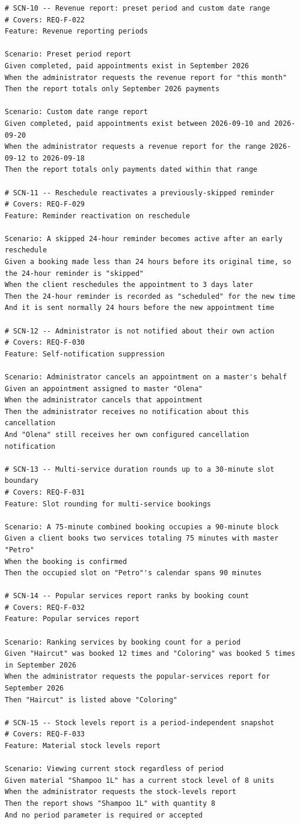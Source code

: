 \documentclass[11pt,a4paper]{article}
\begin{document}
\begin{lstlisting}
# SCN-10 -- Revenue report: preset period and custom date range
# Covers: REQ-F-022
Feature: Revenue reporting periods

Scenario: Preset period report
Given completed, paid appointments exist in September 2026
When the administrator requests the revenue report for "this month"
Then the report totals only September 2026 payments

Scenario: Custom date range report
Given completed, paid appointments exist between 2026-09-10 and 2026-09-20
When the administrator requests a revenue report for the range 2026-09-12 to 2026-09-18
Then the report totals only payments dated within that range

# SCN-11 -- Reschedule reactivates a previously-skipped reminder
# Covers: REQ-F-029
Feature: Reminder reactivation on reschedule

Scenario: A skipped 24-hour reminder becomes active after an early reschedule
Given a booking made less than 24 hours before its original time, so the 24-hour reminder is "skipped"
When the client reschedules the appointment to 3 days later
Then the 24-hour reminder is recorded as "scheduled" for the new time
And it is sent normally 24 hours before the new appointment time

# SCN-12 -- Administrator is not notified about their own action
# Covers: REQ-F-030
Feature: Self-notification suppression

Scenario: Administrator cancels an appointment on a master's behalf
Given an appointment assigned to master "Olena"
When the administrator cancels that appointment
Then the administrator receives no notification about this cancellation
And "Olena" still receives her own configured cancellation notification

# SCN-13 -- Multi-service duration rounds up to a 30-minute slot boundary
# Covers: REQ-F-031
Feature: Slot rounding for multi-service bookings

Scenario: A 75-minute combined booking occupies a 90-minute block
Given a client books two services totaling 75 minutes with master "Petro"
When the booking is confirmed
Then the occupied slot on "Petro"'s calendar spans 90 minutes

# SCN-14 -- Popular services report ranks by booking count
# Covers: REQ-F-032
Feature: Popular services report

Scenario: Ranking services by booking count for a period
Given "Haircut" was booked 12 times and "Coloring" was booked 5 times in September 2026
When the administrator requests the popular-services report for September 2026
Then "Haircut" is listed above "Coloring"

# SCN-15 -- Stock levels report is a period-independent snapshot
# Covers: REQ-F-033
Feature: Material stock levels report

Scenario: Viewing current stock regardless of period
Given material "Shampoo 1L" has a current stock level of 8 units
When the administrator requests the stock-levels report
Then the report shows "Shampoo 1L" with quantity 8
And no period parameter is required or accepted
\end{lstlisting}
\end{document}
